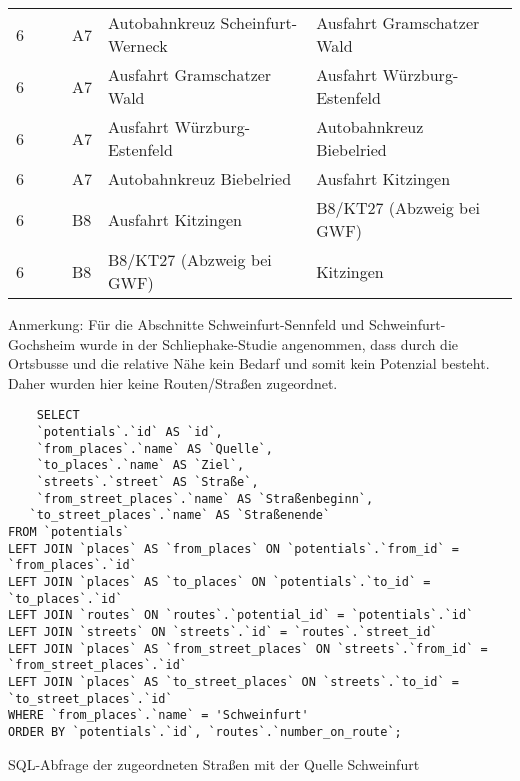 \begin{tabular}{|l|l|l|l|l|l|l|}
    6 &  &  & A7 & Autobahnkreuz Scheinfurt-Werneck & Ausfahrt Gramschatzer Wald\\ 
    6 &  &  & A7 & Ausfahrt Gramschatzer Wald & Ausfahrt Würzburg-Estenfeld\\ 
    6 &  &  & A7 & Ausfahrt Würzburg-Estenfeld & Autobahnkreuz Biebelried\\ 
    6 &  &  & A7 & Autobahnkreuz Biebelried & Ausfahrt Kitzingen\\ 
    6 &  &  & B8 & Ausfahrt Kitzingen & B8/KT27 (Abzweig bei GWF)\\ 
    6 &  &  & B8 & B8/KT27 (Abzweig bei GWF) & Kitzingen\\         
    \hline
\end{tabular}
\newline
\newline
Anmerkung: Für die Abschnitte Schweinfurt-Sennfeld und Schweinfurt-Gochsheim wurde in der Schliephake-Studie angenommen, dass durch die Ortsbusse und die relative Nähe kein Bedarf und somit kein Potenzial besteht. Daher wurden hier keine Routen/Straßen zugeordnet.
\newline
\begin{listing}[htbp]
\begin{verbatim}
    SELECT 
	`potentials`.`id` AS `id`,
	`from_places`.`name` AS `Quelle`, 
	`to_places`.`name` AS `Ziel`,
	`streets`.`street` AS `Straße`,
	`from_street_places`.`name` AS `Straßenbeginn`,
   `to_street_places`.`name` AS `Straßenende`
FROM `potentials`
LEFT JOIN `places` AS `from_places` ON `potentials`.`from_id` = `from_places`.`id`
LEFT JOIN `places` AS `to_places` ON `potentials`.`to_id` = `to_places`.`id`
LEFT JOIN `routes` ON `routes`.`potential_id` = `potentials`.`id`
LEFT JOIN `streets` ON `streets`.`id` = `routes`.`street_id`
LEFT JOIN `places` AS `from_street_places` ON `streets`.`from_id` = `from_street_places`.`id`
LEFT JOIN `places` AS `to_street_places` ON `streets`.`to_id` = `to_street_places`.`id`
WHERE `from_places`.`name` = 'Schweinfurt'
ORDER BY `potentials`.`id`, `routes`.`number_on_route`;
\end{verbatim}
\caption{SQL-Abfrage der zugeordneten Straßen mit der Quelle Schweinfurt}\label{lst-rt-schweinfurt}
\end{listing}


